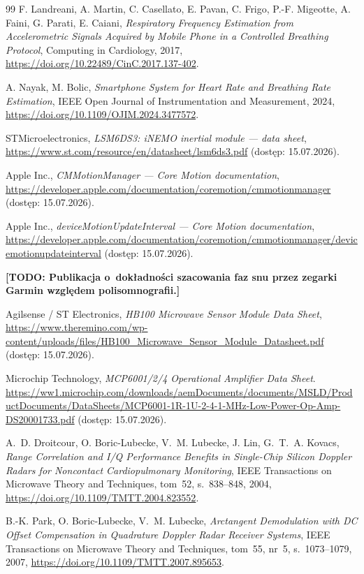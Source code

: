 \documentclass[12pt,a4paper,oneside]{report}
\newcommand{\todo}[1]{\textcolor{red!75!black}{\textbf{[TODO: #1]}}}
\begin{document}
\begin{thebibliography}{99}
F. Landreani, A. Martin, C. Casellato, E. Pavan, C. Frigo,
P.-F. Migeotte, A. Faini, G. Parati, E. Caiani, \emph{Respiratory Frequency
Estimation from Accelerometric Signals Acquired by Mobile Phone in a
Controlled Breathing Protocol}, Computing in Cardiology, 2017,
\url{https://doi.org/10.22489/CinC.2017.137-402}.

A. Nayak, M. Bolic, \emph{Smartphone System for Heart Rate and Breathing Rate
Estimation}, IEEE Open Journal of Instrumentation and Measurement, 2024,
\url{https://doi.org/10.1109/OJIM.2024.3477572}.

STMicroelectronics, \emph{LSM6DS3: iNEMO inertial module --- data sheet},
\url{https://www.st.com/resource/en/datasheet/lsm6ds3.pdf}
(dostęp: 15.07.2026).

Apple Inc., \emph{CMMotionManager --- Core Motion documentation},
\url{https://developer.apple.com/documentation/coremotion/cmmotionmanager}
(dostęp: 15.07.2026).

Apple Inc., \emph{deviceMotionUpdateInterval --- Core Motion documentation},
\url{https://developer.apple.com/documentation/coremotion/cmmotionmanager/devicemotionupdateinterval}
(dostęp: 15.07.2026).

\todo{Publikacja o~dokładności szacowania faz snu przez zegarki Garmin
względem polisomnografii.}

Agilsense / ST Electronics, \emph{HB100 Microwave Sensor Module Data Sheet},
\url{https://www.theremino.com/wp-content/uploads/files/HB100_Microwave_Sensor_Module_Datasheet.pdf}
(dostęp: 15.07.2026).

Microchip Technology, \emph{MCP6001/2/4 Operational Amplifier Data Sheet}.
\url{https://ww1.microchip.com/downloads/aemDocuments/documents/MSLD/ProductDocuments/DataSheets/MCP6001-1R-1U-2-4-1-MHz-Low-Power-Op-Amp-DS20001733.pdf}
(dostęp: 15.07.2026).

A.~D. Droitcour, O. Boric-Lubecke, V.~M. Lubecke, J. Lin, G.~T.~A. Kovacs,
\emph{Range Correlation and I/Q Performance Benefits in Single-Chip Silicon
Doppler Radars for Noncontact Cardiopulmonary Monitoring}, IEEE Transactions
on Microwave Theory and Techniques, tom~52, s.~838--848, 2004,
\url{https://doi.org/10.1109/TMTT.2004.823552}.

B.-K. Park, O. Boric-Lubecke, V.~M. Lubecke, \emph{Arctangent Demodulation
with DC Offset Compensation in Quadrature Doppler Radar Receiver Systems},
IEEE Transactions on Microwave Theory and Techniques, tom~55, nr~5,
s.~1073--1079, 2007, \url{https://doi.org/10.1109/TMTT.2007.895653}.


\end{thebibliography}
\end{document}
